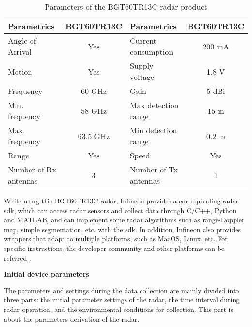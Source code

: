 \begin{table}
    \centering
    \caption{Parameters of the BGT60TR13C radar product \cite{ag_bgt60tr13c_nodate}}
    \label{parametrics of the radar product}
    \begin{tabular}{cc|cc}
        \hline
        \multicolumn{1}{l|}{Parametrics} & BGT60TR13C & \multicolumn{1}{l|}{Parametrics} & BGT60TR13C \\
        \hline
        \multicolumn{1}{l|}{Angle of Arrival} & Yes & \multicolumn{1}{l|}{Current consumption} & 200 mA \\
        \hline
        \multicolumn{1}{l|}{Motion} & Yes & \multicolumn{1}{l|}{Supply voltage} & 1.8 V \\
        \hline
        \multicolumn{1}{l|}{Frequency} & 60 GHz & \multicolumn{1}{l|}{Gain} & 5 dBi \\
        \hline
        \multicolumn{1}{l|}{Min. frequency} & 58 GHz & \multicolumn{1}{l|}{Max detection range} & 15 m \\
        \hline
        \multicolumn{1}{l|}{Max. frequency} & 63.5 GHz & \multicolumn{1}{l|}{Min detection range} & 0.2 m \\
        \hline
        \multicolumn{1}{l|}{Range} & Yes & \multicolumn{1}{l|}{Speed} & Yes \\
        \hline
        \multicolumn{1}{l|}{Number of Rx antennas} & 3 & \multicolumn{1}{l|}{Number of Tx antennas} & 1 \\
        \hline
    \end{tabular}
\end{table}

While using this BGT60TR13C radar, Infineon provides a corresponding radar \gls{sdk}, which can access radar sensors and collect data through C/C++, Python and MATLAB, and can implement some radar algorithms such as range-Doppler map, simple segmentation, etc. with the \gls{sdk}. In addition, Infineon also provides wrappers that adapt to multiple platforms, such as MacOS, Linux, etc. For specific instructions, the developer community and other platforms can be referred \cite{noauthor_how_2023}.

\begin{spacing}{1.5}
\textbf{\large{Initial device parameters}}
\end{spacing}

The parameters and settings during the data collection are mainly divided into three parts: the initial parameter settings of the radar, the time interval during radar operation, and the environmental conditions for collection. This part is about the parameters derivation of the radar.

